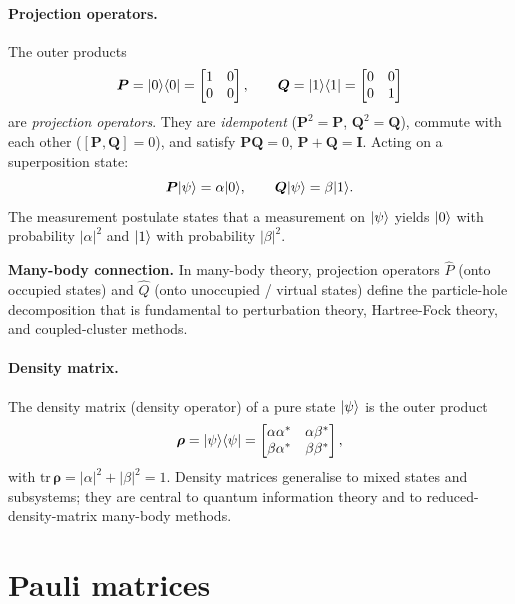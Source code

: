 \paragraph{Projection operators.}
The outer products
\[
  \bm{P}=\vert 0 \rangle\langle 0 \vert=\begin{bmatrix}1&0\\0&0\end{bmatrix},
  \qquad
  \bm{Q}=\vert 1 \rangle\langle 1 \vert=\begin{bmatrix}0&0\\0&1\end{bmatrix}
\]
are \emph{projection operators}.  They are \emph{idempotent}
($\bm{P}^2=\bm{P}$, $\bm{Q}^2=\bm{Q}$), commute with each other
($[\bm{P},\bm{Q}]=0$), and satisfy $\bm{P}\bm{Q}=0$,
$\bm{P}+\bm{Q}=\bm{I}$.  Acting on a superposition state:
\[
  \bm{P}\vert \psi \rangle=\alpha\vert 0 \rangle,\qquad
  \bm{Q}\vert \psi \rangle=\beta\vert 1 \rangle.
\]
The measurement postulate states that a measurement on $\vert \psi \rangle$
yields $\vert 0 \rangle$ with probability $|\alpha|^2$ and $\vert 1 \rangle$ with
probability $|\beta|^2$.

\begin{notebox}
\textbf{Many-body connection.} In many-body theory, projection
operators $\hat{P}$ (onto occupied states) and $\hat{Q}$ (onto
unoccupied / virtual states) define the particle-hole decomposition
that is fundamental to perturbation theory, Hartree-Fock theory, and
coupled-cluster methods.
\end{notebox}

\paragraph{Density matrix.}
The density matrix (density operator) of a pure state $\vert \psi \rangle$
is the outer product
\[
  \bm{\rho} = \vert \psi \rangle\langle \psi \vert
  = \begin{bmatrix}\alpha\alpha^{*}&\alpha\beta^{*}\\\beta\alpha^{*}&\beta\beta^{*}\end{bmatrix},
\]
with $\mathrm{tr}\,\bm{\rho}=|\alpha|^2+|\beta|^2=1$.  Density matrices
generalise to mixed states and subsystems; they are central to quantum
information theory and to reduced-density-matrix many-body methods.

\section{Pauli matrices}
\label{sec:pauli}

